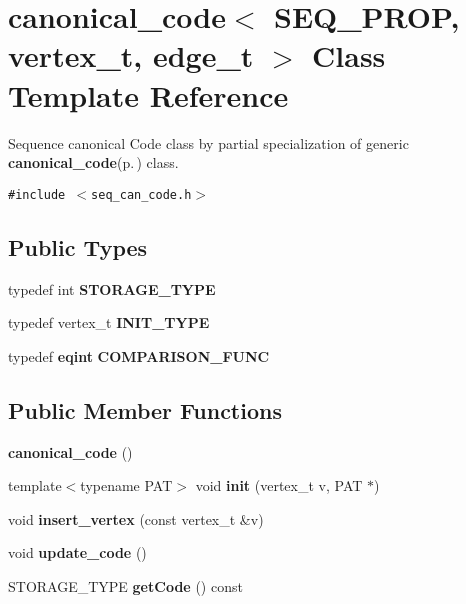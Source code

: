 \section{canonical\_\-code$<$ SEQ\_\-PROP, vertex\_\-t, edge\_\-t $>$ Class Template Reference}
\label{classcanonical__code_3_01SEQ__PROP_00_01vertex__t_00_01edge__t_01_4}
Sequence canonical Code class by partial specialization of generic {\bf canonical\_\-code}{\rm (p.\,\pageref{classcanonical__code})} class.  


{\tt \#include $<$seq\_\-can\_\-code.h$>$}

\subsection*{Public Types}
\begin{CompactItemize}
\item 
typedef int {\bf STORAGE\_\-TYPE}\label{classcanonical__code_3_01SEQ__PROP_00_01vertex__t_00_01edge__t_01_4_w0}

\item 
typedef vertex\_\-t {\bf INIT\_\-TYPE}\label{classcanonical__code_3_01SEQ__PROP_00_01vertex__t_00_01edge__t_01_4_w1}

\item 
typedef {\bf eqint} {\bf COMPARISON\_\-FUNC}\label{classcanonical__code_3_01SEQ__PROP_00_01vertex__t_00_01edge__t_01_4_w2}

\end{CompactItemize}
\subsection*{Public Member Functions}
\begin{CompactItemize}
\item 
{\bf canonical\_\-code} ()\label{classcanonical__code_3_01SEQ__PROP_00_01vertex__t_00_01edge__t_01_4_a0}

\item 
template$<$typename PAT$>$ void {\bf init} (vertex\_\-t v, PAT $\ast$)
\item 
void {\bf insert\_\-vertex} (const  vertex\_\-t \&v)
\item 
void {\bf update\_\-code} ()\label{classcanonical__code_3_01SEQ__PROP_00_01vertex__t_00_01edge__t_01_4_a3}

\item 
STORAGE\_\-TYPE {\bf get\-Code} () const 
\end{CompactItemize}


